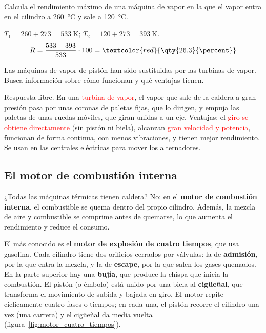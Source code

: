 \begin{exercise}
    Calcula el rendimiento máximo de una máquina de vapor en la que el vapor entra en el cilindro a \qty{260}{\degreeCelsius} y sale a \qty{120}{\degreeCelsius}.
    \begin{solu}
        \(T_1 = 260 + 273 = \qty{533}{\kelvin}\); \(T_2 = 120 + 273 = \qty{393}{\kelvin}\).
        \[ R = \frac{533 - 393}{533} \cdot 100 = \textcolor{red}{\qty{26.3}{\percent}} \]
    \end{solu}
\end{exercise}

\begin{exercise}
    Las máquinas de vapor de pistón han sido sustituidas por las turbinas de vapor. Busca información sobre cómo funcionan y qué ventajas tienen.
    \begin{solu}
        Respuesta libre. En una \textcolor{red}{turbina de vapor}, el vapor que sale de la caldera a gran presión pasa por unas coronas de paletas fijas, que lo dirigen, y empuja las paletas de unas ruedas móviles, que giran unidas a un eje. Ventajas: el \textcolor{red}{giro se obtiene directamente} (sin pistón ni biela), alcanzan \textcolor{red}{gran velocidad y potencia}, funcionan de forma continua, con menos vibraciones, y tienen mejor rendimiento. Se usan en las centrales eléctricas para mover los alternadores.
    \end{solu}
\end{exercise}

\subsection{El motor de combustión interna}

¿Todas las máquinas térmicas tienen caldera? No: en el \textbf{motor de combustión interna}, el combustible se quema dentro del propio cilindro. Además, la mezcla de aire y combustible se comprime antes de quemarse, lo que aumenta el rendimiento y reduce el consumo.

El más conocido es el \textbf{motor de explosión de cuatro tiempos}, que usa gasolina. Cada cilindro tiene dos orificios cerrados por válvulas: la de \textbf{admisión}, por la que entra la mezcla, y la de \textbf{escape}, por la que salen los gases quemados. En la parte superior hay una \textbf{bujía}, que produce la chispa que inicia la combustión. El pistón (o émbolo) está unido por una biela al \textbf{cigüeñal}, que transforma el movimiento de subida y bajada en giro. El motor repite cíclicamente cuatro fases o tiempos; en cada una, el pistón recorre el cilindro una vez (una carrera) y el cigüeñal da media vuelta (figura~\ref{fig:motor_cuatro_tiempos}).


